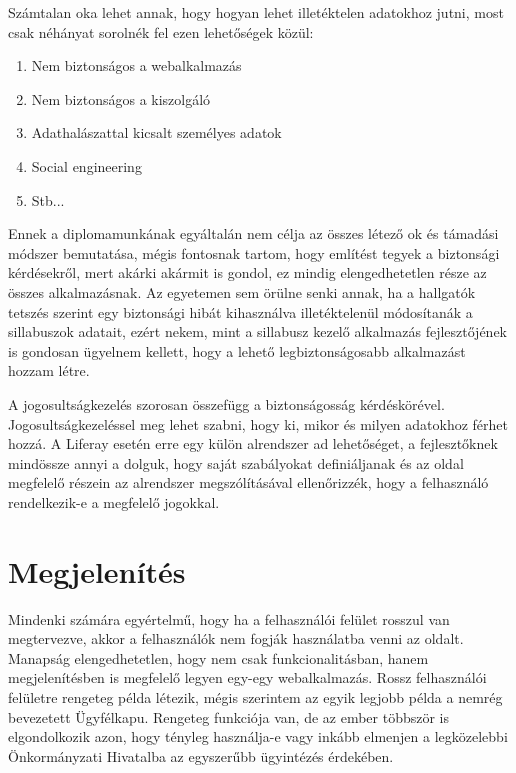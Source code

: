 \documentclass[hidelinks, 12pt, a4paper]{report}
\begin{document}
Számtalan oka lehet annak, hogy hogyan lehet illetéktelen adatokhoz jutni, most csak néhányat sorolnék fel ezen lehetőségek közül:
\begin{enumerate}
\item Nem biztonságos a webalkalmazás
\item Nem biztonságos a kiszolgáló
\item Adathalászattal kicsalt személyes adatok
\item Social engineering
\item Stb...
\end{enumerate}

Ennek a diplomamunkának egyáltalán nem célja az összes létező ok és támadási módszer bemutatása, mégis fontosnak tartom, hogy említést tegyek a biztonsági kérdésekről, mert akárki akármit is gondol, ez mindig elengedhetetlen része az összes alkalmazásnak. Az egyetemen sem örülne senki annak, ha a hallgatók tetszés szerint egy biztonsági hibát kihasználva illetéktelenül módosítanák a sillabuszok adatait, ezért nekem, mint a sillabusz kezelő alkalmazás fejlesztőjének is gondosan ügyelnem kellett, hogy a lehető legbiztonságosabb alkalmazást hozzam létre.

A jogosultságkezelés szorosan összefügg a biztonságosság kérdéskörével. Jogosultságkezeléssel meg lehet szabni, hogy ki, mikor és milyen adatokhoz férhet hozzá. A Liferay esetén erre egy külön alrendszer ad lehetőséget, a fejlesztőknek mindössze annyi a dolguk, hogy saját szabályokat definiáljanak és az oldal megfelelő részein az alrendszer megszólításával ellenőrizzék, hogy a felhasználó rendelkezik-e a megfelelő jogokkal.


\section{Megjelenítés}

Mindenki számára egyértelmű, hogy ha a felhasználói felület rosszul van megtervezve, akkor a felhasználók nem fogják használatba venni az oldalt. Manapság elengedhetetlen, hogy nem csak funkcionalitásban, hanem megjelenítésben is megfelelő legyen egy-egy webalkalmazás. Rossz felhasználói felületre rengeteg példa létezik, mégis szerintem az egyik legjobb példa a nemrég bevezetett Ügyfélkapu. Rengeteg funkciója van, de az ember többször is elgondolkozik azon, hogy tényleg használja-e vagy inkább elmenjen a legközelebbi Önkormányzati Hivatalba az egyszerűbb ügyintézés érdekében.
\end{document}
